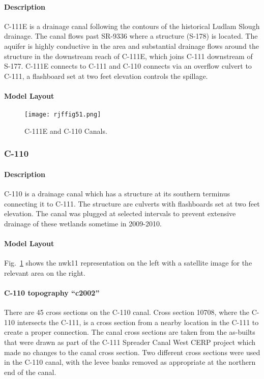 \paragraph{Description}
C-111E is a drainage canal following the contours of the historical Ludlam Slough drainage. The canal flows past SR-9336 where a structure (S-178) is located. The aquifer is highly conductive in the area and substantial drainage flows around the structure in the downstream reach of C-111E, which joins C-111 downstream of S-177. C-111E connects to C-111 and C-110 connects via an overflow culvert to C-111, a flashboard set at two feet elevation controls the spillage.

\paragraph{Model Layout}

\begin{figure}[!h]
  \begin{center}
  \texttt{[image: rjffig51.png]}
  \caption{C-111E and C-110 Canals.}
  \label{fig:rjffig51}
  \end{center}
\end{figure}


\clearpage
\subsubsection{C-110}
\paragraph{Description}
C-110 is a drainage canal which has a structure at its southern terminus connecting it to C-111. The structure are culverts with flashboards set at two feet elevation. The canal was plugged at selected intervals to prevent extensive drainage of these wetlands sometime in 2009-2010.

\paragraph{Model Layout}
Fig.~\ref{fig:rjffig51} shows the nwk11 representation on the left with a satellite image for the relevant area on the right.


\paragraph{C-110 topography ``c2002''}
There are 45 cross sections on the C-110 canal.  Cross section 10708, where the C-110 intersects the C-111, is a cross section from a nearby location in the C-111 to create a proper connection.    The canal cross sections are taken from the as-builts that were drawn as part of the C-111 Spreader Canal West CERP project which made no changes to the canal cross section\citep{USACE2011C111Spreader}.  Two different cross sections were used in the C-110 canal, with the levee banks removed as appropriate at the northern end of the canal.


